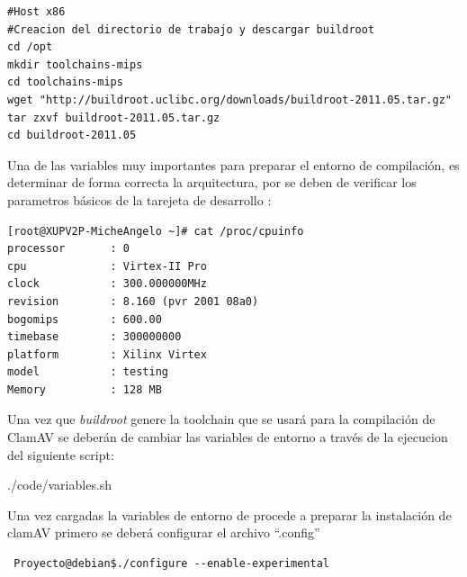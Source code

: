 \begin{verbatim}
#Host x86
#Creacion del directorio de trabajo y descargar buildroot
cd /opt
mkdir toolchains-mips
cd toolchains-mips
wget "http://buildroot.uclibc.org/downloads/buildroot-2011.05.tar.gz"
tar zxvf buildroot-2011.05.tar.gz
cd buildroot-2011.05
\end{verbatim}

Una de las  variables muy importantes para preparar el entorno de compilación, 
es determinar de forma correcta  la arquitectura, por se deben de verificar  
los parametros básicos de la tarejeta de desarrollo :

\begin{verbatim}
[root@XUPV2P-MicheAngelo ~]# cat /proc/cpuinfo                                  
processor       : 0                                                             
cpu             : Virtex-II Pro                                                 
clock           : 300.000000MHz                                                 
revision        : 8.160 (pvr 2001 08a0)                                         
bogomips        : 600.00                                                        
timebase        : 300000000                                                     
platform        : Xilinx Virtex                                                 
model           : testing                                                       
Memory          : 128 MB 
\end{verbatim}

Una vez que \emph{buildroot} genere la toolchain que se usará para la 
compilación de ClamAV se deberán de cambiar las variables de entorno a través 
de la ejecucion del siguiente script:



{./code/variables.sh}


Una vez  cargadas la variables de entorno de procede a preparar la instalación 
de   clamAV primero se deber\'a configurar el archivo ``.config''
\begin{verbatim}
 Proyecto@debian$./configure --enable-experimental
\end{verbatim}


